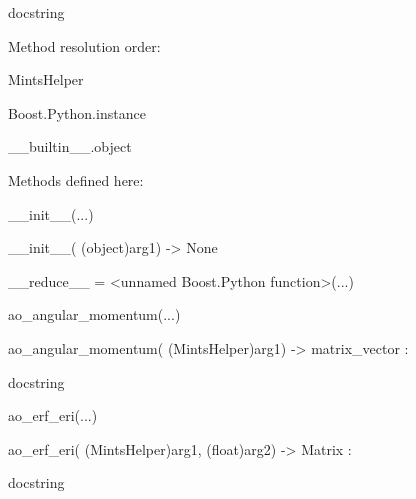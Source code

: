 \documentclass[letterpaper,10pt,english]{sphinxmanual}
\begin{document}
\begin{description}
\begin{description}
\item[{class MintsHelper(Boost.Python.instance)}] \leavevmode
\begin{DUlineblock}{0em}
\item[] docstring
\item[] 
\item[] Method resolution order:
\item[]
\begin{DUlineblock}{\DUlineblockindent}
\item[] MintsHelper
\item[] Boost.Python.instance
\item[] \_\_builtin\_\_.object
\item[] 
\end{DUlineblock}
\item[] Methods defined here:
\item[] 
\item[] \_\_init\_\_(...)
\item[]
\begin{DUlineblock}{\DUlineblockindent}
\item[] \_\_init\_\_( (object)arg1) -\textgreater{} None
\item[] 
\end{DUlineblock}
\item[] \_\_reduce\_\_ = \textless{}unnamed Boost.Python function\textgreater{}(...)
\item[] 
\item[] ao\_angular\_momentum(...)
\item[]
\begin{DUlineblock}{\DUlineblockindent}
\item[] ao\_angular\_momentum( (MintsHelper)arg1) -\textgreater{} matrix\_vector :
\item[]
\begin{DUlineblock}{\DUlineblockindent}
\item[] docstring
\item[] 
\end{DUlineblock}
\end{DUlineblock}
\item[] ao\_erf\_eri(...)
\item[]
\begin{DUlineblock}{\DUlineblockindent}
\item[] ao\_erf\_eri( (MintsHelper)arg1, (float)arg2) -\textgreater{} Matrix :
\item[]
\begin{DUlineblock}{\DUlineblockindent}
\item[] docstring

\end{DUlineblock}
\end{DUlineblock}
\end{DUlineblock}
\end{description}
\end{description}
\end{document}
